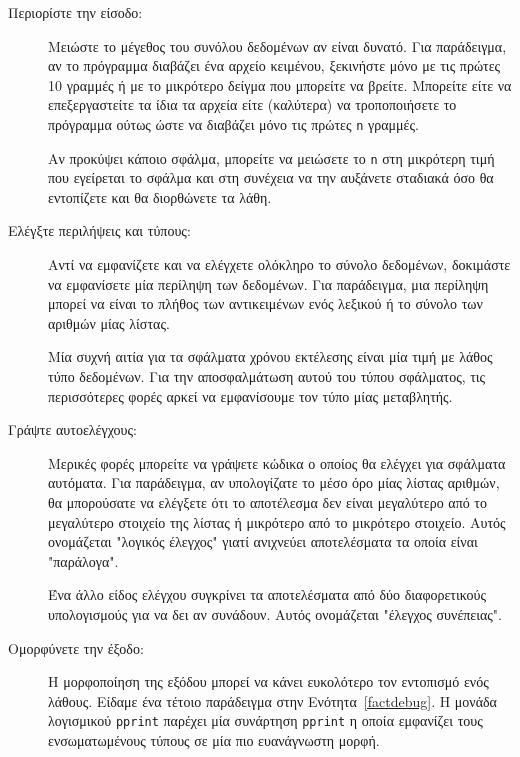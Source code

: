 \documentclass[10pt]{book}
\begin{document}
\begin{description}

\item [Περιορίστε την είσοδο:] Μειώστε το μέγεθος του συνόλου δεδομένων αν είναι δυνατό. Για παράδειγμα, αν το πρόγραμμα διαβάζει ένα αρχείο κειμένου, ξεκινήστε μόνο με τις πρώτες 10 γραμμές ή με το μικρότερο δείγμα που μπορείτε να βρείτε. Μπορείτε είτε να επεξεργαστείτε τα ίδια τα αρχεία είτε (καλύτερα) να τροποποιήσετε το πρόγραμμα ούτως ώστε να διαβάζει μόνο τις πρώτες  {\tt n} γραμμές.

Αν προκύψει κάποιο σφάλμα, μπορείτε να μειώσετε το {\tt n} στη μικρότερη τιμή που εγείρεται το σφάλμα και στη συνέχεια να την αυξάνετε σταδιακά όσο θα εντοπίζετε και θα διορθώνετε τα λάθη.

\item [Ελέγξτε περιλήψεις και τύπους:] Αντί να εμφανίζετε και να ελέγχετε ολόκληρο το σύνολο δεδομένων, δοκιμάστε να εμφανίσετε μία περίληψη των δεδομένων. Για  παράδειγμα, μια περίληψη μπορεί να είναι το πλήθος των αντικειμένων ενός λεξικού ή το σύνολο των αριθμών μίας λίστας.

Μία συχνή αιτία για τα σφάλματα χρόνου εκτέλεσης είναι μία τιμή με λάθος τύπο δεδομένων. Για την αποσφαλμάτωση αυτού του τύπου σφάλματος, τις περισσότερες φορές αρκεί να εμφανίσουμε τον τύπο μίας μεταβλητής.

\item[Γράψτε αυτοελέγχους:] Μερικές φορές μπορείτε να γράψετε κώδικα ο οποίος θα ελέγχει για σφάλματα αυτόματα. Για παράδειγμα, αν υπολογίζατε το μέσο όρο μίας λίστας αριθμών, θα μπορούσατε να ελέγξετε ότι το αποτέλεσμα δεν είναι μεγαλύτερο από το μεγαλύτερο στοιχείο της λίστας ή μικρότερο από το μικρότερο στοιχείο. Αυτός ονομάζεται "λογικός έλεγχος" γιατί ανιχνεύει αποτελέσματα τα οποία είναι "παράλογα".

Ένα άλλο είδος ελέγχου συγκρίνει τα αποτελέσματα από δύο διαφορετικούς υπολογισμούς για να δει αν συνάδουν. Αυτός ονομάζεται "έλεγχος συνέπειας".

\item[Ομορφύνετε την έξοδο:] Η μορφοποίηση της εξόδου μπορεί να κάνει ευκολότερο τον εντοπισμό ενός λάθους. Είδαμε ένα τέτοιο παράδειγμα στην Ενότητα~\ref{factdebug}. Η μονάδα λογισμικού {\tt pprint} παρέχει μία συνάρτηση  {\tt pprint} η οποία εμφανίζει τους ενσωματωμένους τύπους σε μία πιο ευανάγνωστη μορφή. 

\end{description}
\end{document}
